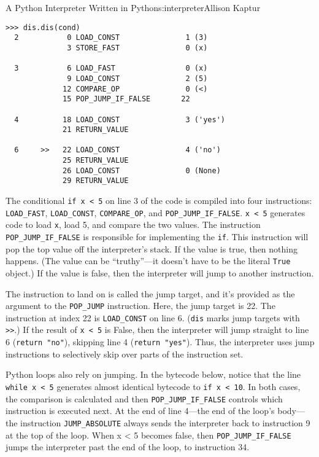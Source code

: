 \begin{aosachapter}{A Python Interpreter Written in Python}{s:interpreter}{Allison Kaptur}
\begin{verbatim}
>>> dis.dis(cond)
  2           0 LOAD_CONST               1 (3)
              3 STORE_FAST               0 (x)

  3           6 LOAD_FAST                0 (x)
              9 LOAD_CONST               2 (5)
             12 COMPARE_OP               0 (<)
             15 POP_JUMP_IF_FALSE       22

  4          18 LOAD_CONST               3 ('yes')
             21 RETURN_VALUE

  6     >>   22 LOAD_CONST               4 ('no')
             25 RETURN_VALUE
             26 LOAD_CONST               0 (None)
             29 RETURN_VALUE
\end{verbatim}

The conditional \texttt{if x \textless{} 5} on line 3 of the code is
compiled into four instructions: \texttt{LOAD\_FAST},
\texttt{LOAD\_CONST}, \texttt{COMPARE\_OP}, and
\texttt{POP\_JUMP\_IF\_FALSE}. \texttt{x \textless{} 5} generates code
to load \texttt{x}, load 5, and compare the two values. The instruction
\texttt{POP\_JUMP\_IF\_FALSE} is responsible for implementing the
\texttt{if}. This instruction will pop the top value off the
interpreter's stack. If the value is true, then nothing happens. (The
value can be ``truthy''---it doesn't have to be the literal
\texttt{True} object.) If the value is false, then the interpreter will
jump to another instruction.

The instruction to land on is called the jump target, and it's provided
as the argument to the \texttt{POP\_JUMP} instruction. Here, the jump
target is 22. The instruction at index 22 is \texttt{LOAD\_CONST} on
line 6. (\texttt{dis} marks jump targets with
\texttt{\textgreater{}\textgreater{}}.) If the result of
\texttt{x \textless{} 5} is False, then the interpreter will jump
straight to line 6 (\texttt{return "no"}), skipping line 4
(\texttt{return "yes"}). Thus, the interpreter uses jump instructions to
selectively skip over parts of the instruction set.

Python loops also rely on jumping. In the bytecode below, notice that
the line \texttt{while x \textless{} 5} generates almost identical
bytecode to \texttt{if x \textless{} 10}. In both cases, the comparison
is calculated and then \texttt{POP\_JUMP\_IF\_FALSE} controls which
instruction is executed next. At the end of line 4---the end of the
loop's body---the instruction \texttt{JUMP\_ABSOLUTE} always sends the
interpreter back to instruction 9 at the top of the loop. When x
\textless{} 5 becomes false, then \texttt{POP\_JUMP\_IF\_FALSE} jumps
the interpreter past the end of the loop, to instruction 34.


\end{aosachapter}
